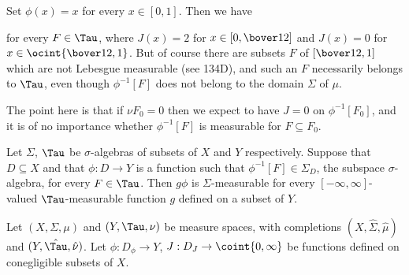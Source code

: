 {


\noindent Set $\phi(x)=x$ for every $x\in[0,1]$.   Then we have


\noindent for every $F\in\Tau$, where $J(x)=2$ for $x\in[0,\bover12]$
and $J(x)=0$ for $x\in\ocint{\bover12,1}$.   But of course there are
subsets $F$ of $[\bover12,1]$ which are not  Lebesgue measurable (see
134D), and such an $F$ necessarily belongs to $\Tau$, even though
$\phi^{-1}[F]$ does not belong to the domain $\Sigma$ of $\mu$.

The point here is that if $\nu F_0=0$  then we expect to have $J=0$ on
$\phi^{-1}[F_0]$, and it is of no importance whether $\phi^{-1}[F]$ is
measurable for $F\subseteq F_0$.
}%

 Let $\Sigma$, $\Tau$ be
$\sigma$-algebras of subsets of $X$ and $Y$ respectively.   Suppose that
$D\subseteq X$ and that $\phi:D\to Y$ is a function such that
$\phi^{-1}[F]\in\Sigma_D$, the subspace $\sigma$-algebra, for every
$F\in\Tau$.   Then $g\phi$ is $\Sigma$-measurable for every
$[-\infty,\infty]$-valued
$\Tau$-measurable function $g$ defined on a subset of $Y$.


 Let $(X,\Sigma,\mu)$ and $(Y,\Tau,\nu)$ be
measure spaces, with completions $(X,\hat\Sigma,\hat\mu)$ and
$(Y,\hat\Tau,\hat\nu)$.   Let $\phi:D_{\phi}\to Y$, $J:D_J\to
\coint{0,\infty}$ be functions defined on conegligible subsets of $X$.

